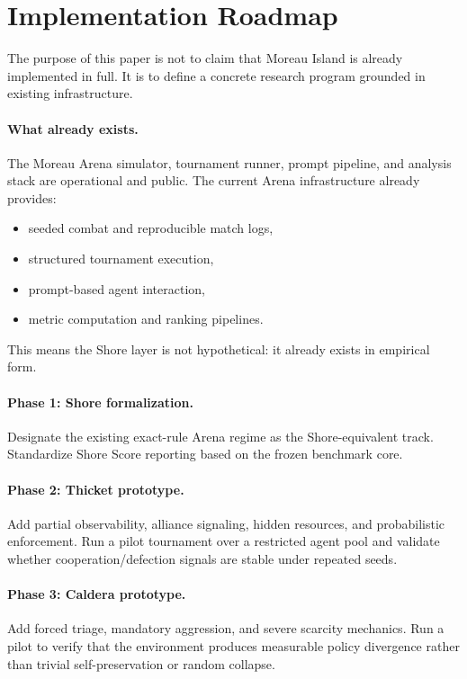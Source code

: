 \documentclass[11pt]{article}
\begin{document}
\section{Implementation Roadmap}

The purpose of this paper is not to claim that Moreau Island is already implemented in full.
It is to define a concrete research program grounded in existing infrastructure.

\paragraph{What already exists.}
The Moreau Arena simulator, tournament runner, prompt pipeline, and analysis stack are operational and public.
The current Arena infrastructure already provides:
\begin{itemize}[leftmargin=*]
\item seeded combat and reproducible match logs,
\item structured tournament execution,
\item prompt-based agent interaction,
\item metric computation and ranking pipelines.
\end{itemize}
This means the Shore layer is not hypothetical: it already exists in empirical form.

\paragraph{Phase 1: Shore formalization.}
Designate the existing exact-rule Arena regime as the Shore-equivalent track.
Standardize Shore Score reporting based on the frozen benchmark core.

\paragraph{Phase 2: Thicket prototype.}
Add partial observability, alliance signaling, hidden resources, and probabilistic enforcement.
Run a pilot tournament over a restricted agent pool and validate whether cooperation/defection signals are stable under repeated seeds.

\paragraph{Phase 3: Caldera prototype.}
Add forced triage, mandatory aggression, and severe scarcity mechanics.
Run a pilot to verify that the environment produces measurable policy divergence rather than trivial self-preservation or random collapse.
\end{document}
